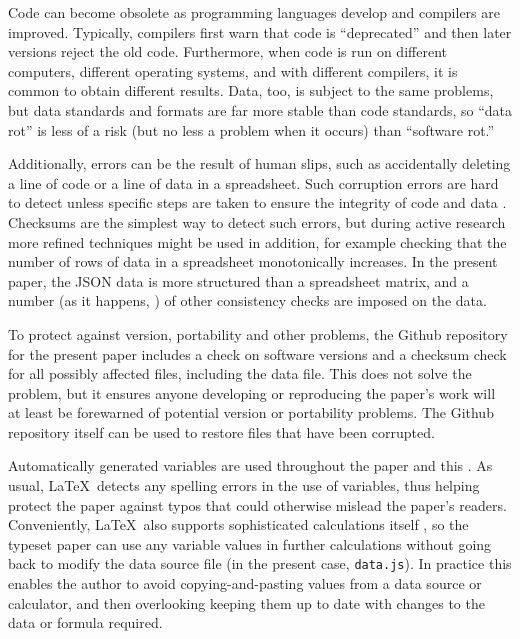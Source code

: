 \documentclass[10pt,a4paper]{article}
\begin{document}
\begin{change}
Code can become obsolete as programming languages develop and compilers are improved. Typically, compilers first warn that code is ``deprecated'' and then later versions reject the old code. Furthermore, when code is run on different computers, different operating systems, and with different compilers, it is common to obtain different results. Data, too, is subject to the same problems, but data standards and formats are far more stable than code standards, so ``data rot'' is less of a risk (but no less a problem when it occurs) than ``software rot.''

Additionally, errors can be the result of human slips, such as accidentally deleting a line of code or a line of data in a spreadsheet. Such corruption errors are hard to detect unless specific steps are taken to ensure the integrity of code and data \cite{excel-fiasco}. Checksums are the simplest way to detect such errors, but during active research more refined techniques might be used in addition, for example checking that the number of rows of data in a spreadsheet monotonically increases. In the present paper, the JSON data is more structured than a spreadsheet matrix, and a number (as it happens, \the\JSONerrorCount) of other consistency checks are imposed on the data.

To protect against version, portability and other problems, the Github repository for the present paper includes a check on software versions and a checksum check for all possibly affected files, including the data file. This does not solve the problem, but it ensures anyone developing or reproducing the paper's work will at least be forewarned of potential version or portability problems. The Github repository itself can be used to restore files that have been corrupted.

Automatically generated variables are used throughout the paper and this \supplement.
As usual, \LaTeX\ detects any spelling errors in the use of variables, thus helping protect the paper against typos that could otherwise mislead the paper's readers. Conveniently, \LaTeX\ also supports sophisticated calculations itself \cite{latex-calculus}, so the typeset paper can use any variable values in further calculations without going back to modify the data source file (in the present case, \texttt{data.js}). In practice this enables the author to avoid copying-and-pasting values from a data source or calculator, and then overlooking keeping them up to date with changes to the data or formula required.


\end{change}
\end{document}
